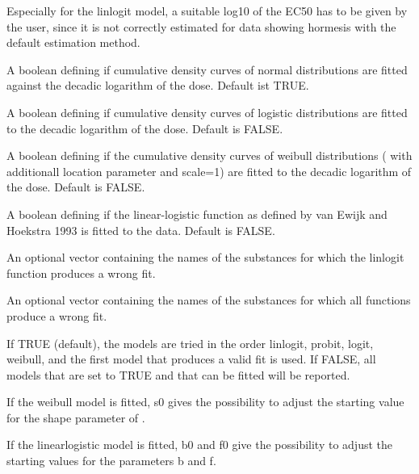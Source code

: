 \begin{Arguments}
\begin{ldescription}
\item[\code{startlogEC50}] Especially for the linlogit model, a suitable log10 of the EC50 has to be given 
by the user, since it is not correctly estimated for data showing hormesis with
the default estimation method.
\item[\code{probit}] A boolean defining if cumulative density curves of normal distributions
 are fitted against the decadic logarithm of the dose.
Default ist TRUE.
\item[\code{logit}] A boolean defining if cumulative density curves of logistic distributions
 are fitted to the decadic logarithm of the dose.
Default is FALSE.
\item[\code{weibull}] A boolean defining if the cumulative density curves of weibull distributions
( with additionall location parameter and scale=1)
are fitted to the decadic logarithm of the dose. Default is FALSE.
\item[\code{linlogit}] A boolean defining if the linear-logistic function
 as defined by van Ewijk and Hoekstra 1993 is
fitted to the data. Default is FALSE.
\item[\code{linlogitWrong}] An optional vector containing the names of the substances for which the
linlogit function produces a wrong fit.
\item[\code{allWrong}] An optional vector containing the names of the substances for which all
functions produce a wrong fit.
\item[\code{chooseone}] If TRUE (default), the models are tried in the order linlogit, probit,
logit, weibull, and the first model that produces a valid fit is used.
If FALSE, all models that are set to TRUE and that can be fitted will be
reported.
\item[\code{s0}] If the weibull model is fitted, s0 gives the possibility to adjust the
starting value for the shape parameter of .
\item[\code{b0,f0}] If the linearlogistic model is fitted, b0 and f0 give the possibility to
adjust the starting values for the parameters b and f.
\end{ldescription}
\end{Arguments}
